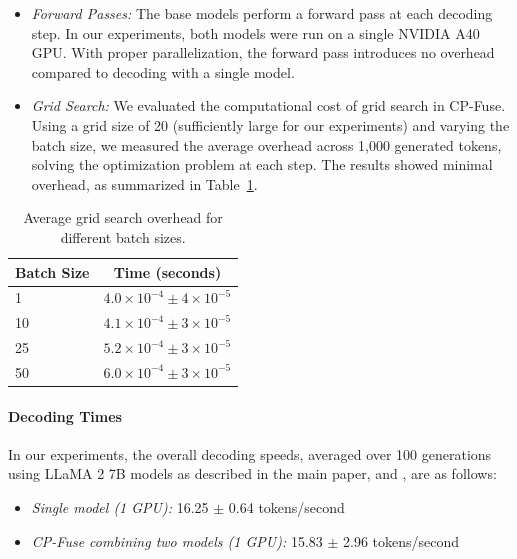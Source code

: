 \begin{itemize}
    \item \textit{Forward Passes:} The base models perform a forward pass at each decoding step. In our experiments, both models were run on a single NVIDIA A40 GPU. With proper parallelization, the forward pass introduces no overhead compared to decoding with a single model.
\item \textit{Grid Search:} We evaluated the computational cost of grid search in CP-Fuse. Using a grid size of 20 (sufficiently large for our experiments) and varying the batch size, we measured the average overhead across 1,000 generated tokens, solving the optimization problem at each step. The results showed minimal overhead, as summarized in Table~\ref{tab:grid_search_overhead}.\end{itemize}






\begin{table}[h]
    \centering
    \begin{tabular}{l c}
        \toprule
        Batch Size & Time (seconds) \\
        \midrule
        1          & $4.0 \times 10^{-4} \pm 4 \times 10^{-5}$ \\
        10         & $4.1 \times 10^{-4} \pm 3 \times 10^{-5}$ \\
        25         & $5.2 \times 10^{-4} \pm 3 \times 10^{-5}$ \\
        50         & $6.0 \times 10^{-4} \pm 3 \times 10^{-5}$ \\
        \bottomrule
    \end{tabular}
    \caption{Average grid search overhead for different batch sizes.}
    \label{tab:grid_search_overhead}
\end{table}

\paragraph{Decoding Times} In our experiments, the overall decoding speeds, averaged over 100 generations using LLaMA 2 7B models as described in the main paper,  and , are as follows:

\begin{itemize}
    \item \textit{Single model (1 GPU):} 16.25 $\pm$ 0.64 tokens/second
    \item \textit{CP-Fuse combining two models (1 GPU):} 15.83 $\pm$ 2.96 tokens/second
\end{itemize}

